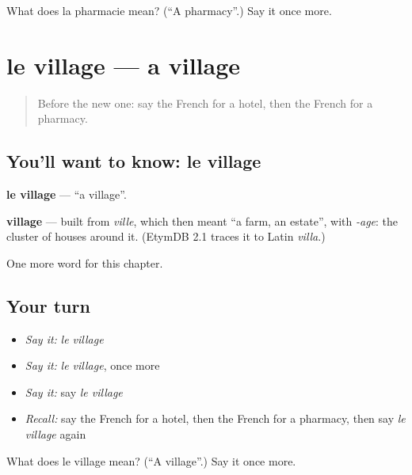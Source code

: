 \begin{tcolorbox}[breakable,colback=teal!4,colframe=teal!35!black,title={Before you move on}]
What does la pharmacie mean? (\textquotedblleft{}A pharmacy\textquotedblright{}.) Say it once more.
\end{tcolorbox}
\section[le village]{le village — a village}

\label{lesson:FR-C101-village}



\begin{quote}
Before the new one: say the French for a hotel, then the French for a pharmacy.
\end{quote}

\subsection*{You'll want to know: le village}
\textbf{le village} — \textquotedblleft{}a village\textquotedblright{}.

\begin{cousinweb}
\textbf{village} — built from \emph{ville}, which then meant \textquotedblleft{}a farm, an estate\textquotedblright{}, with \emph{-age}: the cluster of houses around it. (EtymDB 2.1 traces it to Latin \emph{villa}.)
\end{cousinweb}

\begin{grammarlens}[title={What you've built}]
One more word for this chapter.
\end{grammarlens}

\subsection*{Your turn}
\begin{itemize}
\raggedright
  \item \emph{Say it:} \emph{le village}
  \item \emph{Say it:} \emph{le village}, once more
  \item \emph{Say it:} say \emph{le village}
  \item \emph{Recall:} say the French for a hotel, then the French for a pharmacy, then say \emph{le village} again
\end{itemize}

\begin{tcolorbox}[breakable,colback=teal!4,colframe=teal!35!black,title={Before you move on}]
What does le village mean? (\textquotedblleft{}A village\textquotedblright{}.) Say it once more.
\end{tcolorbox}
